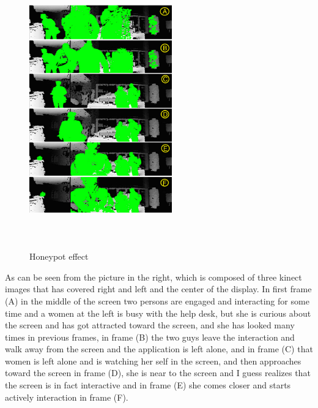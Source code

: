 \begin{figure}
  \vspace{-30pt}
  \begin{center}
    \includegraphics[width=0.55\textwidth,height=120mm]{Figures/9/effects/honeypot}
  \end{center}
  \vspace{-20pt}
  \caption{Honeypot effect}
  \vspace{-60pt}
\end{figure}
As can be seen from the picture in the right, which is composed of three kinect images that has covered right and left and the center of the display. 
In first frame (A) in the middle of the screen two persons are engaged and interacting for some time and a women at the left is busy with the help desk, but she is curious about the screen and has got attracted toward the screen, and she has looked many times in previous frames, in frame (B) the two guys leave the interaction and walk away from the screen and the application is left alone, and in frame (C) that women is left alone and is watching her self in the screen, and then approaches toward the screen in frame (D), she is near to the screen and I guess realizes that the screen is in fact interactive and in frame (E) she comes closer and starts actively interaction in frame (F). 
 







